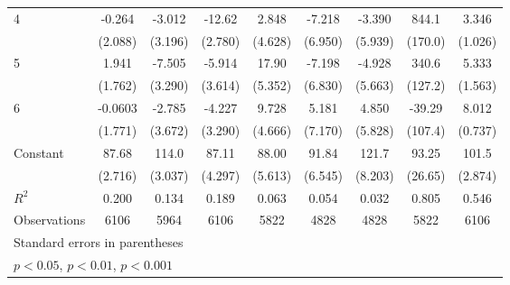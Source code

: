 \documentclass{article}
\begin{document}
{\begin{longtable}{l*{8}{c}}
4               &   -0.264         &   -3.012         &   -12.62\sym{***}&    2.848         &   -7.218         &   -3.390         &    844.1\sym{***}&    3.346\sym{**} \\
                &  (2.088)         &  (3.196)         &  (2.780)         &  (4.628)         &  (6.950)         &  (5.939)         &  (170.0)         &  (1.026)         \\
5               &    1.941         &   -7.505\sym{*}  &   -5.914         &    17.90\sym{**} &   -7.198         &   -4.928         &    340.6\sym{*}  &    5.333\sym{**} \\
                &  (1.762)         &  (3.290)         &  (3.614)         &  (5.352)         &  (6.830)         &  (5.663)         &  (127.2)         &  (1.563)         \\
6               &  -0.0603         &   -2.785         &   -4.227         &    9.728\sym{*}  &    5.181         &    4.850         &   -39.29         &    8.012\sym{***}\\
                &  (1.771)         &  (3.672)         &  (3.290)         &  (4.666)         &  (7.170)         &  (5.828)         &  (107.4)         &  (0.737)         \\
Constant        &    87.68\sym{***}&    114.0\sym{***}&    87.11\sym{***}&    88.00\sym{***}&    91.84\sym{***}&    121.7\sym{***}&    93.25\sym{**} &    101.5\sym{***}\\
                &  (2.716)         &  (3.037)         &  (4.297)         &  (5.613)         &  (6.545)         &  (8.203)         &  (26.65)         &  (2.874)         \\
\hline
\(R^{2}\)       &    0.200         &    0.134         &    0.189         &    0.063         &    0.054         &    0.032         &    0.805         &    0.546         \\
Observations    &     6106         &     5964         &     6106         &     5822         &     4828         &     4828         &     5822         &     6106         \\
\hline\hline
\multicolumn{9}{l}{\footnotesize Standard errors in parentheses}\\
\multicolumn{9}{l}{\footnotesize \sym{*} \(p<0.05\), \sym{**} \(p<0.01\), \sym{***} \(p<0.001\)}\\
\end{longtable}
}
\end{document}
